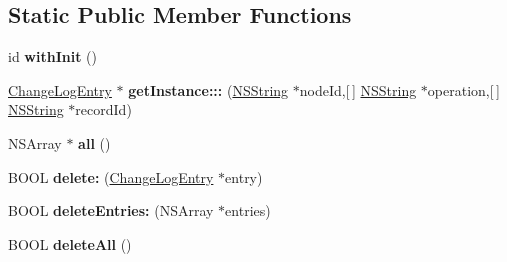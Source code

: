 \subsection*{\-Static \-Public \-Member \-Functions}
\begin{DoxyCompactItemize}
\item 
\hypertarget{interface_change_log_entry_a727fd3f9e2c54e11ccb89aaa54b90a2c}{
id {\bfseries with\-Init} ()}
\label{interface_change_log_entry_a727fd3f9e2c54e11ccb89aaa54b90a2c}

\item 
\hypertarget{interface_change_log_entry_a76b9984ca6098087fd398687faefddc6}{
\hyperlink{interface_change_log_entry}{\-Change\-Log\-Entry} $\ast$ {\bfseries get\-Instance\-:::} (\hyperlink{class_n_s_string}{\-N\-S\-String} $\ast$node\-Id,\mbox{[}$\,$\mbox{]} \hyperlink{class_n_s_string}{\-N\-S\-String} $\ast$operation,\mbox{[}$\,$\mbox{]} \hyperlink{class_n_s_string}{\-N\-S\-String} $\ast$record\-Id)}
\label{interface_change_log_entry_a76b9984ca6098087fd398687faefddc6}

\item 
\hypertarget{interface_change_log_entry_a27479d2824c718b9cfb1e403aa65c8a6}{
\-N\-S\-Array $\ast$ {\bfseries all} ()}
\label{interface_change_log_entry_a27479d2824c718b9cfb1e403aa65c8a6}

\item 
\hypertarget{interface_change_log_entry_ad378791d9950baa91456636934577045}{
\-B\-O\-O\-L {\bfseries delete\-:} (\hyperlink{interface_change_log_entry}{\-Change\-Log\-Entry} $\ast$entry)}
\label{interface_change_log_entry_ad378791d9950baa91456636934577045}

\item 
\hypertarget{interface_change_log_entry_a2dc7605fbe40f13d81d928476b58a1b7}{
\-B\-O\-O\-L {\bfseries delete\-Entries\-:} (\-N\-S\-Array $\ast$entries)}
\label{interface_change_log_entry_a2dc7605fbe40f13d81d928476b58a1b7}

\item 
\hypertarget{interface_change_log_entry_a30c171361954d538145de4756f4351be}{
\-B\-O\-O\-L {\bfseries delete\-All} ()}
\label{interface_change_log_entry_a30c171361954d538145de4756f4351be}

\end{DoxyCompactItemize}

